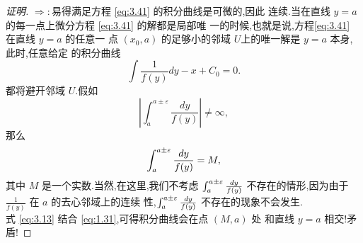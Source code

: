 \documentclass[a4paper, 12pt]{article} %
\begin{document}
\begin{proof}[证明]
  \ni$\Rightarrow:$易得满足方程 \eqref{eq:3.41} 的积分曲线是可微的,因此
  连续.当在直线 $y=a$ 的每一点上微分方程 \eqref{eq:3.41} 的解都是局部唯
  一的时候,也就是说,方程\eqref{eq:3.41} 在直线 $y=a$ 的任意一
  点 $(x_0,a)$ 的足够小的邻域 $U$上的唯一解是 $y=a$ 本身,此时,任意给定
  的积分曲线
  \begin{equation}
    \label{eq:12.47}
    \int \frac{1}{f(y)}dy-x+C_{0}=0.
  \end{equation}
  都将避开邻域 $U$.假如
$$
|\int_a^{a\pm \varepsilon}\frac{dy}{f(y)}|\neq\infty,
$$
那么
\begin{equation}
  \label{eq:3.13}
  \int_a^{a\pm\varepsilon}\frac{dy}{f(y)}=M,
\end{equation}
其中 $M$ 是一个实数.当然,在这里,我们不考虑
$\int_a^{a\pm\varepsilon}\frac{dy}{f(y)}$ 不存在的情形,因为由于
$\frac{1}{f(y)}$ 在 $a$ 的去心邻域上的连续
性,$\int_a^{a\pm\varepsilon}\frac{dy}{f(y)}$ 不存在的现象不会发生.\\

式 \eqref{eq:3.13} 结合 \eqref{eq:1.31},可得积分曲线会在点 $(M,a)$ 处
和直线 $y=a$ 相交!矛盾!
\end{proof}
\end{document}

